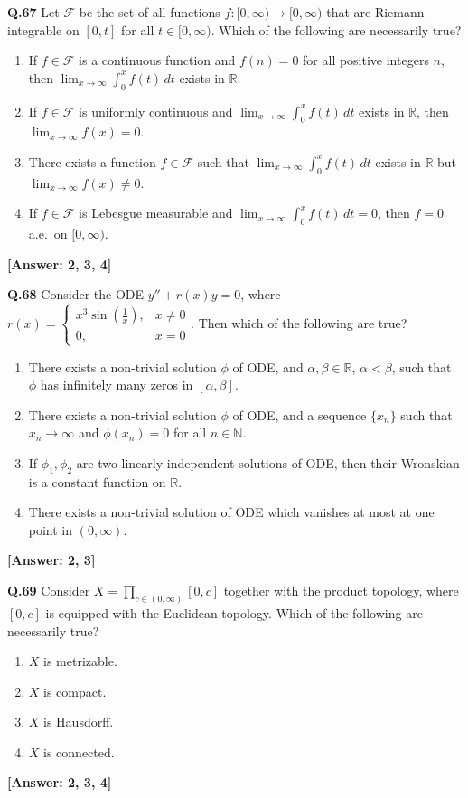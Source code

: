 \documentclass[12pt,a4paper]{article}
\newcommand{\ans}[1]{\quad\textcolor{anscolor}{\textbf{[Answer: #1]}}}
\begin{document}
\textbf{Q.67} Let $\mathcal{F}$ be the set of all functions $f:[0,\infty)\to[0,\infty)$ that are Riemann integrable on $[0,t]$ for all $t\in[0,\infty)$. Which of the following are necessarily true?
\begin{enumerate}[label=\arabic*.]
\item If $f\in\mathcal{F}$ is a continuous function and $f(n)=0$ for all positive integers $n$, then $\lim_{x\to\infty}\int_0^xf(t)\,dt$ exists in $\mathbb{R}$.
\item If $f\in\mathcal{F}$ is uniformly continuous and $\lim_{x\to\infty}\int_0^xf(t)\,dt$ exists in $\mathbb{R}$, then $\lim_{x\to\infty}f(x)=0$.
\item There exists a function $f\in\mathcal{F}$ such that $\lim_{x\to\infty}\int_0^xf(t)\,dt$ exists in $\mathbb{R}$ but $\lim_{x\to\infty}f(x)\neq0$.
\item If $f\in\mathcal{F}$ is Lebesgue measurable and $\lim_{x\to\infty}\int_0^xf(t)\,dt=0$, then $f=0$ a.e.\ on $[0,\infty)$.
\end{enumerate}\ans{2, 3, 4}

\textbf{Q.68} Consider the ODE $y''+r(x)y=0$, where $r(x)=\begin{cases}x^3\sin\!\left(\tfrac{1}{x}\right),&x\neq0\\0,&x=0\end{cases}$. Then which of the following are true?
\begin{enumerate}[label=\arabic*.]
\item There exists a non-trivial solution $\phi$ of ODE, and $\alpha,\beta\in\mathbb{R}$, $\alpha<\beta$, such that $\phi$ has infinitely many zeros in $[\alpha,\beta]$.
\item There exists a non-trivial solution $\phi$ of ODE, and a sequence $\{x_n\}$ such that $x_n\to\infty$ and $\phi(x_n)=0$ for all $n\in\mathbb{N}$.
\item If $\phi_1,\phi_2$ are two linearly independent solutions of ODE, then their Wronskian is a constant function on $\mathbb{R}$.
\item There exists a non-trivial solution of ODE which vanishes at most at one point in $(0,\infty)$.
\end{enumerate}\ans{2, 3}

\textbf{Q.69} Consider $X=\prod_{c\in(0,\infty)}[0,c]$ together with the product topology, where $[0,c]$ is equipped with the Euclidean topology. Which of the following are necessarily true?
\begin{enumerate}[label=\arabic*.]
\item $X$ is metrizable. \item $X$ is compact. \item $X$ is Hausdorff. \item $X$ is connected.
\end{enumerate}\ans{2, 3, 4}
\end{document}
